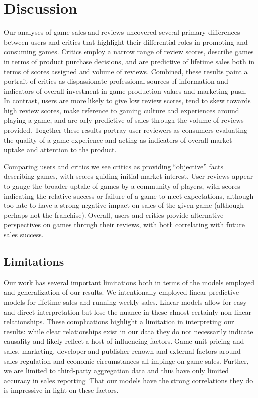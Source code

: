 \documentclass[letterpaper]{article}
\begin{document}
\section{Discussion}
Our analyses of game sales and reviews uncovered several primary differences between users and critics that highlight their differential roles in promoting and consuming games. Critics employ a narrow range of review scores, describe games in terms of product purchase decisions, and are predictive of lifetime sales both in terms of scores assigned and volume of reviews. Combined, these results paint a portrait of critics as dispassionate professional sources of information and indicators of overall investment in game production values and marketing push. In contrast, users are more likely to give low review scores, tend to skew towards high review scores, make reference to gaming culture and experiences around playing a game, and are only predictive of sales through the volume of reviews provided. Together these results portray user reviewers as consumers evaluating the quality of a game experience and acting as indicators of overall market uptake and attention to the product.

Comparing users and critics we see critics as providing ``objective'' facts describing games, with scores guiding initial market interest. User reviews appear to gauge the broader uptake of games by a community of players, with scores indicating the relative success or failure of a game to meet expectations, although too late to have a strong negative impact on sales of the given game (although perhaps not the franchise). Overall, users and critics provide alternative perspectives on games through their reviews, with both correlating with future sales success.

\subsection{Limitations}
Our work has several important limitations both in terms of the models employed and generalization of our results. We intentionally employed linear predictive models for lifetime sales and running weekly sales. Linear models allow for easy and direct interpretation but lose the nuance in these almost certainly non-linear relationships. These complications highlight a limitation in interpreting our results: while clear relationships exist in our data they do not necessarily indicate causality and likely reflect a host of influencing factors. Game unit pricing and sales, marketing, developer and publisher renown and external factors around sales regulation and economic circumstances all impinge on game sales. Further, we are limited to third-party aggregation data and thus have only limited accuracy in sales reporting. That our models have the strong correlations they do is impressive in light on these factors.
\end{document}
